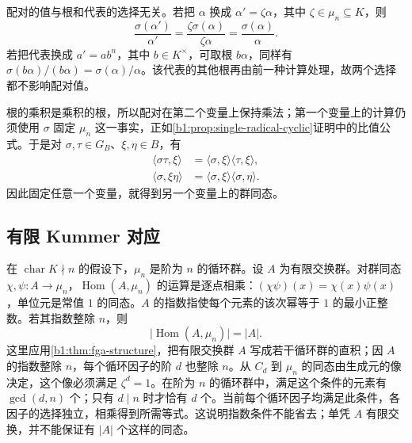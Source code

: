 配对的值与根和代表的选择无关。若把 \(\alpha\) 换成 \(\alpha'=\zeta\alpha\)，其中 \(\zeta\in\mu_n\subseteq K\)，则
\[
	\frac{\sigma(\alpha')}{\alpha'}= \frac{\zeta\sigma(\alpha)}{\zeta\alpha}= \frac{\sigma(\alpha)}{\alpha}.
\]
若把代表换成 \(a'=ab^n\)，其中 \(b\in K^\times\)，可取根 \(b\alpha\)，同样有 \(\sigma(b\alpha)/(b\alpha)=\sigma(\alpha)/\alpha\)。该代表的其他根再由前一种计算处理，故两个选择都不影响配对值。

\ProseParagraphBreak
根的乘积是乘积的根，所以配对在第二个变量上保持乘法；第一个变量上的计算仍须使用 \(\sigma\) 固定 \(\mu_n\) 这一事实，正如\cref{b1:prop:single-radical-cyclic}证明中的比值公式。于是对 \(\sigma,\tau\in G_B\)、\(\xi,\eta\in B\)，有
\[
	\begin{aligned}
		\langle\sigma\tau,\xi\rangle&= \langle\sigma,\xi\rangle\langle\tau,\xi\rangle,\\
		\langle\sigma,\xi\eta\rangle&= \langle\sigma,\xi\rangle\langle\sigma,\eta\rangle.
	\end{aligned}
\]
因此固定任意一个变量，就得到另一个变量上的群同态。

\subsection{有限 Kummer 对应}
\label{b1:subsec:2003:03}

在 \(\operatorname{char}K\nmid n\) 的假设下，\(\mu_n\) 是阶为 \(n\) 的循环群。设 \(A\) 为有限交换群。对群同态 \(\chi,\psi:A\rightarrow\mu_n\)，\(\operatorname{Hom}(A,\mu_n)\) 的运算是逐点相乘：\((\chi\psi)(x)=\chi(x)\psi(x)\)，单位元是常值 \(1\) 的同态。\(A\) 的指数指使每个元素的该次幂等于 \(1\) 的最小正整数。若其指数整除 \(n\)，则
\begin{equation}\label{b1:eq:finite-character-count}
	\bigl|\operatorname{Hom}(A,\mu_n)\bigr|=|A|.
\end{equation}
这里应用\cref{b1:thm:fga-structure}，把有限交换群 \(A\) 写成若干循环群的直积；因 \(A\) 的指数整除 \(n\)，每个循环因子的阶 \(d\) 也整除 \(n\)。从 \(C_d\) 到 \(\mu_n\) 的同态由生成元的像决定，这个像必须满足 \(\zeta^d=1\)。在阶为 \(n\) 的循环群中，满足这个条件的元素有 \(\gcd(d,n)\) 个；只有 \(d\mid n\) 时才恰有 \(d\) 个。当前每个循环因子均满足此条件，各因子的选择独立，相乘得到所需等式。这说明指数条件不能省去；单凭 \(A\) 有限交换，并不能保证有 \(|A|\) 个这样的同态。

